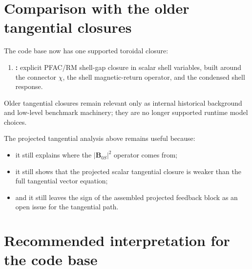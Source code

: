 \documentclass[11pt,a4paper]{article}
\begin{document}
\section{Comparison with the older tangential closures}

The code base now has one supported toroidal closure:
\begin{enumerate}
\item \textbf{:} explicit PFAC/RM shell-gap closure in
scalar shell variables, built around the connector \(\chi\), the shell
magnetic-return operator, and the condensed shell response.
\end{enumerate}

Older tangential closures remain relevant only as internal historical
background and low-level benchmark machinery; they are no longer supported
runtime model choices.

The projected tangential analysis above remains useful because:
\begin{itemize}
\item it still explains where the $|\mathbf B_{0S}|^2$ operator comes from;
\item it still shows that the projected scalar tangential closure is weaker
than the full tangential vector equation;
\item and it still leaves the sign of the assembled projected feedback block as
an open issue for the tangential path.
\end{itemize}

\section{Recommended interpretation for the code base}
\end{document}
